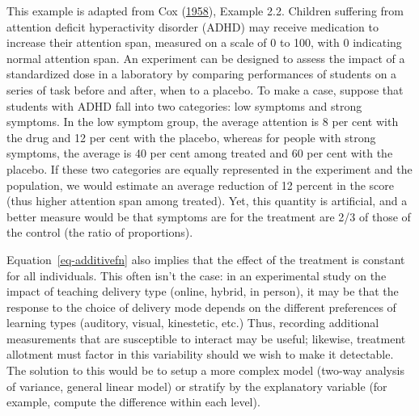 \documentclass[
  11pt,
  letterpaper,
]{scrbook}
\theoremstyle{definition}
\theoremstyle{remark}
\begin{document}
This example is adapted from Cox
(\protect\hyperlink{ref-Cox:1958}{1958}), Example 2.2. Children
suffering from attention deficit hyperactivity disorder (ADHD) may
receive medication to increase their attention span, measured on a scale
of 0 to 100, with 0 indicating normal attention span. An experiment can
be designed to assess the impact of a standardized dose in a laboratory
by comparing performances of students on a series of task before and
after, when to a placebo. To make a case, suppose that students with
ADHD fall into two categories: low symptoms and strong symptoms. In the
low symptom group, the average attention is 8 per cent with the drug and
12 per cent with the placebo, whereas for people with strong symptoms,
the average is 40 per cent among treated and 60 per cent with the
placebo. If these two categories are equally represented in the
experiment and the population, we would estimate an average reduction of
12 percent in the score (thus higher attention span among treated). Yet,
this quantity is artificial, and a better measure would be that symptoms
are for the treatment are 2/3 of those of the control (the ratio of
proportions).

Equation~\ref{eq-additivefn} also implies that the effect of the
treatment is constant for all individuals. This often isn't the case: in
an experimental study on the impact of teaching delivery type (online,
hybrid, in person), it may be that the response to the choice of
delivery mode depends on the different preferences of learning types
(auditory, visual, kinestetic, etc.) Thus, recording additional
measurements that are susceptible to interact may be useful; likewise,
treatment allotment must factor in this variability should we wish to
make it detectable. The solution to this would be to setup a more
complex model (two-way analysis of variance, general linear model) or
stratify by the explanatory variable (for example, compute the
difference within each level).
\end{document}
